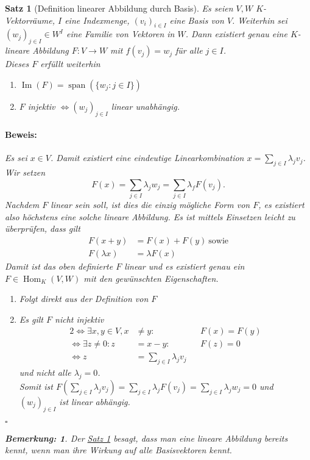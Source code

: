 \documentclass{report}
\newcommand{\lb}{\lambda}
\DeclareMathOperator{\Span}{span}
\DeclareMathOperator{\Hom}{Hom}
\DeclareMathOperator{\Ima}{Im}
\theoremstyle{customrem}
\newtheorem*{bem}{Bemerkung\textnormal:}
\theoremstyle{customdef}
\newtheorem{satz}[definition]{Satz}
\renewenvironment{proof}{\vspace{-.75cm}\paragraph{Beweis: }}{\vspace{-.5cm}\hfill$\square$}
\begin{document}
	\begin{satz}[Definition linearer Abbildung durch Basis]
		\label{satz33}
		Es seien $V, W$ $K$-Vektorräume, $I$ eine Indexmenge, $(v_i)_{i \in I}$ eine Basis von $V$. Weiterhin sei $(w_j)_{j \in I} \in W^I$ eine Familie von Vektoren in $W$. Dann existiert genau eine $K$-lineare Abbildung $F : V \to W$ mit $f(v_j) = w_j$ für alle $j \in I$.\\
		
		\noindent Dieses $F$ erfüllt weiterhin
		\begin{enumerate}[leftmargin = 4cm]
			\item $\Ima(F) = \Span(\{w_j : j \in I\})$
			\item $F$ injektiv $\Leftrightarrow (w_j)_{j \in I}$ linear unabhängig.
		\end{enumerate}
		
		\begin{proof}
			Es sei $x \in V$. Damit existiert eine eindeutige Linearkombination $x = \sum_{j \in I} \lb_j v_j$. Wir setzen $$F(x) = \sum_{j \in I}\lb_jw_j = \sum_{j \in I} \lb_fF(v_j).$$ Nachdem $F$ linear sein soll, ist dies die einzig mögliche Form von $F$, es existiert also höchstens eine solche lineare Abbildung. Es ist mittels Einsetzen leicht zu überprüfen, dass gilt
			\begin{align*}
				F(x + y) &= F(x) + F(y)\ \text{sowie}\\
				F(\lb x) &= \lb F(x)
			\end{align*}
			Damit ist das oben definierte $F$ linear und es existiert genau ein $F \in \Hom_K(V, W)$ mit den gewünschten Eigenschaften.
			\begin{enumerate}[leftmargin=2cm]
				\item[Zu 1.:]Folgt direkt aus der Definition von $F$
				\item[Zu 2.:]Es gilt $F$ nicht injektiv 
				\begin{alignat*}{2}
					\Leftrightarrow \exists x, y \in V, x &\neq y : && F(x) = F(y)\\
					\Leftrightarrow \exists z \neq 0 : z &= x - y : && F(z) = 0\\
					\Leftrightarrow z &= \sum_{j \in I} \lb_j v_j
				\end{alignat*}
				und nicht alle $\lb_j = 0$.\\
				Somit ist $F\left(\sum_{j \in I}\lb_j v_j\right) = \sum_{j \in I} \lb_j F(v_j) = \sum_{j \in I} \lb_j w_j = 0$ und $(w_j)_{j \in I}$ ist linear abhängig.\\
			\end{enumerate}
		\end{proof}
		
		\begin{bem}
			Der \hyperref[satz33]{Satz \ref{satz33}} besagt, dass man eine lineare Abbildung bereits kennt, wenn man ihre Wirkung auf alle Basisvektoren kennt. 
		\end{bem}
	\end{satz}
	
\end{document}
